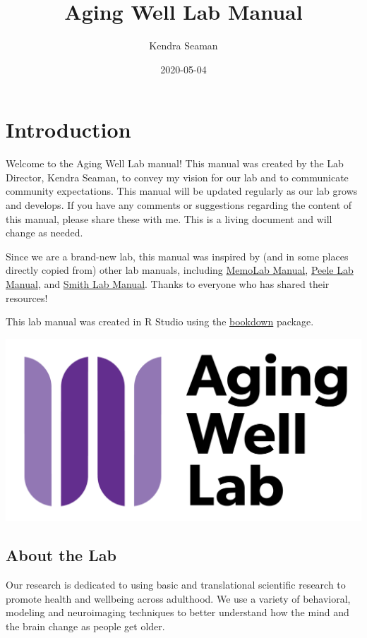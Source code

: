 \documentclass[]{book}
\title{Aging Well Lab Manual}
\author{Kendra Seaman}
\date{2020-05-04}
\begin{document}
\maketitle

{
\setcounter{tocdepth}{1}
\tableofcontents
}
\hypertarget{introduction}{%
\chapter{Introduction}\label{introduction}}

Welcome to the Aging Well Lab manual! This manual was created by the Lab Director, Kendra Seaman, to convey my vision for our lab and to communicate community expectations. This manual will be updated regularly as our lab grows and develops. If you have any comments or suggestions regarding the content of this manual, please share these with me. This is a living document and will change as needed.

Since we are a brand-new lab, this manual was inspired by (and in some places directly copied from) other lab manuals, including \href{https://github.com/memobc/memolab-manual}{MemoLab Manual}, \href{http://jpeelle.net/peellelab_manual.pdf}{Peele Lab Manual}, and \href{https://github.com/DVSneuro/smithlab_manual/blob/master/SmithLab_manual.pdf}{Smith Lab Manual}. Thanks to everyone who has shared their resources!

This lab manual was created in R Studio using the \href{https://bookdown.org/yihui/bookdown/}{bookdown} package.

\includegraphics{images/awl.png}

\hypertarget{about-the-lab}{%
\section{About the Lab}\label{about-the-lab}}

Our research is dedicated to using basic and translational scientific research to promote health and wellbeing across adulthood. We use a variety of behavioral, modeling and neuroimaging techniques to better understand how the mind and the brain change as people get older.
\end{document}
